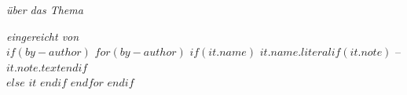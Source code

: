 \begin{titlepage}
\begin{flushleft}
        \vspace{1.0cm}
        

        \vspace{1.0cm}

        {
            \rmfamily\normalsize
            \textit{über das Thema}
        }

        \vspace{0.1cm}

        {
            \rmfamily\LARGE
            \texplatetitle
        }

        \vspace{1.0cm}
        
        {\rmfamily\normalsize
            \textit{eingereicht von}\\
            $if(by-author)$
            $for(by-author)$
                $if(it.name)$
                    $it.name.literal$$if(it.note)$ -- $it.note.text$$endif$\\ 
                $else$
                    $it$
                $endif$
            $endfor$
            $endif$         
        }

        
        
        \vfill
        

        \begin{multicols}{3}
            \footnotesize
            \rmfamily

            \textsc{\texplatesupervisortype}\\
            \texplatesupervisor


\end{multicols}
\end{flushleft}
\end{titlepage}
